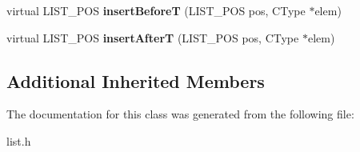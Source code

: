 \begin{DoxyCompactItemize}
\item 
\hypertarget{class_c_list_t_affdeb2786698f49ea1dda928591cbc5e}{virtual L\-I\-S\-T\-\_\-\-P\-O\-S {\bfseries insert\-Before\-T} (L\-I\-S\-T\-\_\-\-P\-O\-S pos, C\-Type $\ast$elem)}\label{class_c_list_t_affdeb2786698f49ea1dda928591cbc5e}

\item 
\hypertarget{class_c_list_t_abcd6ee703a0256c5ecd6f04fd7c83e6b}{virtual L\-I\-S\-T\-\_\-\-P\-O\-S {\bfseries insert\-After\-T} (L\-I\-S\-T\-\_\-\-P\-O\-S pos, C\-Type $\ast$elem)}\label{class_c_list_t_abcd6ee703a0256c5ecd6f04fd7c83e6b}

\end{DoxyCompactItemize}
\subsection*{Additional Inherited Members}


The documentation for this class was generated from the following file\-:\begin{DoxyCompactItemize}
\item 
list.\-h\end{DoxyCompactItemize}
